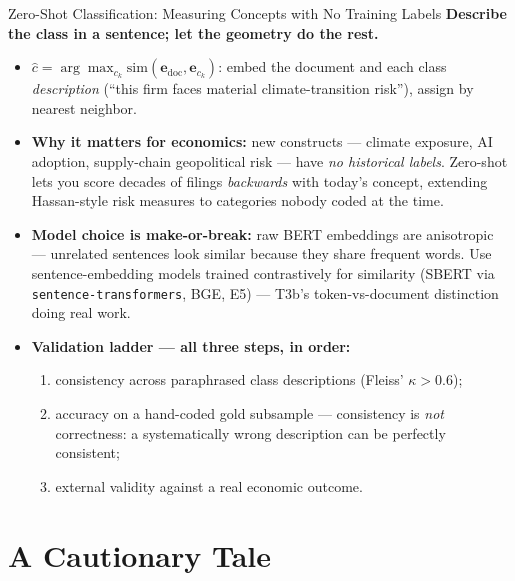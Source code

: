 \begin{frame}{Zero-Shot Classification: Measuring Concepts with No Training Labels}
\textbf{Describe the class in a sentence; let the geometry do the rest.}
\begin{itemize}
\item $\hat c = \arg\max_{c_k} \mathrm{sim}(\mathbf{e}_{\text{doc}}, \mathbf{e}_{c_k})$: embed the document and each class \emph{description} (``this firm faces material climate-transition risk''), assign by nearest neighbor.
\item \textbf{Why it matters for economics:} new constructs --- climate exposure, AI adoption, supply-chain geopolitical risk --- have \emph{no historical labels}. Zero-shot lets you score decades of filings \emph{backwards} with today's concept, extending Hassan-style risk measures to categories nobody coded at the time.
\item \textbf{Model choice is make-or-break:} raw BERT embeddings are anisotropic --- unrelated sentences look similar because they share frequent words. Use sentence-embedding models trained contrastively for similarity (SBERT via \texttt{sentence-transformers}, BGE, E5) --- T3b's token-vs-document distinction doing real work.
\item \textbf{Validation ladder --- all three steps, in order:}
\begin{enumerate}
    \item consistency across paraphrased class descriptions (Fleiss' $\kappa > 0.6$);
    \item accuracy on a hand-coded gold subsample --- consistency is \emph{not} correctness: a systematically wrong description can be perfectly consistent;
    \item external validity against a real economic outcome.
\end{enumerate}
\end{itemize}
\end{frame}

\section{A Cautionary Tale}

